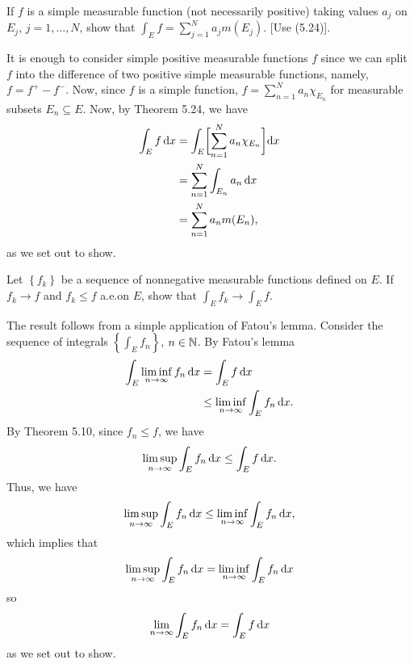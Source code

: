 \begin{problem}
  If \(f\) is a simple measurable function (not necessarily positive)
  taking values \(a_j\) on \(E_j\), \(j=1,\dotsc,N\), show that
  \(\int_E f=\sum_{j=1}^N a_jm(E_j)\). [Use (5.24)].
\end{problem}
\begin{solution}
  It is enough to consider simple positive measurable functions \(f\) since
  we can split \(f\) into the difference of two positive simple measurable
  functions, namely, \(f=f^+-f^-\). Now, since \(f\) is a simple function,
  \(f=\sum_{n=1}^Na_n\chi_{E_n}\) for measurable subsets
  \(E_n\subseteq E\). Now, by Theorem 5.24, we have
  \begin{align*}
    \int_E f\mathop{}\!\mathrm{d} x
    &=\int_E\biggl[ \sum_{n=1}^N a_n\chi_{E_n} \biggr]\mathrm{d} x\\
    &=\sum_{n=1}^N \int_{E_n} a_n\mathop{}\!\mathrm{d} x\\
    &=\sum_{n=1}^N a_n m(E_n),
  \end{align*}
  as we set out to show.
\end{solution}

\begin{problem}
  Let \(\left\{f_k\right\}\) be a sequence of nonnegative measurable
  functions defined on \(E\). If \(f_k\to f\) and \(f_k\leq f\) a.e.\@ on
  \(E\), show that \(\int_E f_k\to\int_E f\).
\end{problem}
\begin{solution}
  The result follows from a simple application of Fatou's lemma. Consider
  the sequence of integrals \(\left\{\int_E f_n \right\}\),
  \(n\in\mathbb{N}\). By Fatou's lemma
  \begin{align*}
    \int_E \liminf_{n\to\infty}f_n\mathop{}\!\mathrm{d} x
    &=\int_E f\mathop{}\!\mathrm{d} x\\
    &\leq\liminf_{n\to\infty}\int_E f_n\mathop{}\!\mathrm{d} x.
  \end{align*}
  By Theorem 5.10, since \(f_n\leq f\), we have
  \[
    \limsup_{n\to\infty}\int_E f_n\mathop{}\!\mathrm{d} x\leq
    \int_E f\mathop{}\!\mathrm{d} x.
  \]
  Thus, we have
  \[
    \limsup_{n\to\infty}\int_E f_n\mathop{}\!\mathrm{d} x\leq
    \liminf_{n\to\infty}\int_E f_n\mathop{}\!\mathrm{d} x,
  \]
  which implies that
  \[
    \limsup_{n\to\infty}\int_E f_n\mathop{}\!\mathrm{d}
    x=\liminf_{n\to\infty}\int_E f_n\mathop{}\!\mathrm{d} x
  \]
  so
  \[
    \lim_{n\to\infty}\int_E f_n\mathop{}\!\mathrm{d} x=
    \int_Ef\mathop{}\!\mathrm{d} x
  \]
  as we set out to show.
\end{solution}


